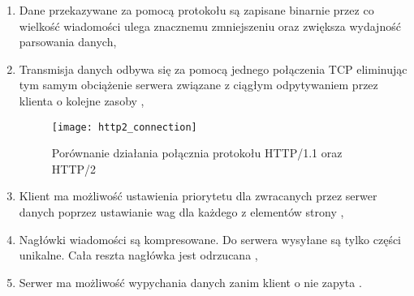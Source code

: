 \begin{enumerate}
    \item Dane przekazywane za pomocą protokołu są zapisane binarnie przez co wielkość wiadomości ulega znacznemu zmniejszeniu oraz zwiększa wydajność parsowania danych, 
    \item Transmisja danych odbywa się za pomocą jednego połączenia TCP eliminując tym samym obciążenie serwera związane z ciągłym odpytywaniem przez klienta o kolejne zasoby \cite{ludin2017learninghmultiplex},
    \begin{figure}[h]
        \caption{Porównanie działania połącznia protokołu HTTP/1.1 oraz HTTP/2}
        \texttt{[image: http2\_connection]}
        \centering
    \end{figure}
    \item Klient ma możliwość ustawienia priorytetu dla zwracanych przez serwer danych poprzez ustawianie wag dla każdego z elementów strony \cite{ludin2017learninghmultiplex},
    \item  Nagłówki wiadomości są kompresowane. Do serwera wysyłane są tylko części unikalne. Cała reszta nagłówka jest odrzucana \cite{ludin2017learninghmultiplex},
    \item Serwer ma możliwość wypychania danych zanim klient o nie zapyta \cite{ludin2017learninghmultiplex}. 
\end{enumerate}  
